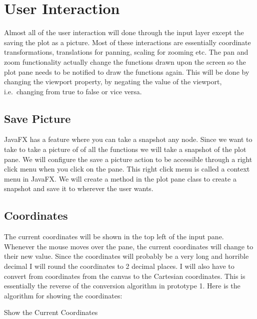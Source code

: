 \documentclass[../../../../main.tex]{subfiles}
\begin{document}
\section{User Interaction}
Almost all of the user interaction will done through the input layer except the saving the plot as a picture. Most of these interactions are essentially coordinate transformations, translations for panning, scaling for zooming etc. The pan and zoom functionality actually change the functions drawn upon the screen so the plot pane needs to be notified to draw the functions again. This will be done by changing the viewport property, by negating the value of the viewport, i.e.\ changing from true to false or vice versa.
\subsection{Save Picture}
JavaFX has a feature where you can take a snapshot\cite{snapshotJava} any node. Since we want to take to take a picture of of all the functions we will take a snapshot of the plot pane. We will configure the save a picture action to be accessible through a right click menu when you click on the pane. This right click menu is called a context menu\cite{contextMenu} in JavaFX. We will create a method in the plot pane class to create a snapshot and save it to wherever the user wants.
\subsection{Coordinates}
The current coordinates will be shown in the top left of the input pane. Whenever the mouse moves over the pane, the current coordinates will change to their new value. Since the coordinates will probably be a very long and horrible decimal I will round the coordinates to 2 decimal places. I will also have to convert from coordinates from the canvas to the Cartesian coordinates. This is essentially the reverse of the conversion algorithm in prototype 1.  Here is the algorithm for showing the coordinates:
\begin{algorithm}[H]
\DontPrintSemicolon
\caption{Show the Current Coordinates}
\end{algorithm}
\end{document}
